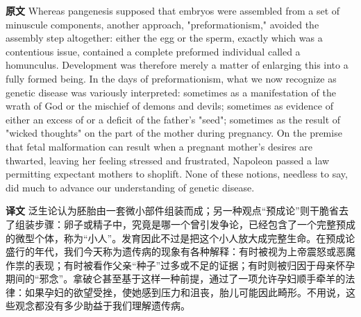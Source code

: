 \documentclass[UTF8,zihao=-4]{ctexart}
\newcommand{\BodyFont}{\fontsize{10.5pt}{15.5pt}\selectfont}
\renewenvironment{quote}{\par\noindent\begingroup\BodyFont}{\par\endgroup}
\begin{document}
\begin{quote}
\noindent\textbf{原文} Whereas pangenesis supposed that embryos were assembled from a set of minuscule components, another approach, "preformationism," avoided the assembly step altogether: either the egg or the sperm, exactly which was a contentious issue, contained a complete preformed individual called a homunculus. Development was therefore merely a matter of enlarging this into a fully formed being. In the days of preformationism, what we now recognize as genetic disease was variously interpreted: sometimes as a manifestation of the wrath of God or the mischief of demons and devils; sometimes as evidence of either an excess of or a deficit of the father's "seed"; sometimes as the result of "wicked thoughts" on the part of the mother during pregnancy. On the premise that fetal malformation can result when a pregnant mother's desires are thwarted, leaving her feeling stressed and frustrated, Napoleon passed a law permitting expectant mothers to shoplift. None of these notions, needless to say, did much to advance our understanding of genetic disease.

\smallskip
\noindent\textbf{译文} 泛生论认为胚胎由一套微小部件组装而成；另一种观点“预成论”则干脆省去了组装步骤：卵子或精子中，究竟是哪一个曾引发争论，已经包含了一个完整预成的微型个体，称为“小人”。发育因此不过是把这个小人放大成完整生命。在预成论盛行的年代，我们今天称为遗传病的现象有各种解释：有时被视为上帝震怒或恶魔作祟的表现；有时被看作父亲“种子”过多或不足的证据；有时则被归因于母亲怀孕期间的“邪念”。拿破仑甚至基于这样一种前提，通过了一项允许孕妇顺手牵羊的法律：如果孕妇的欲望受挫，使她感到压力和沮丧，胎儿可能因此畸形。不用说，这些观念都没有多少助益于我们理解遗传病。
\end{quote}
\end{document}
